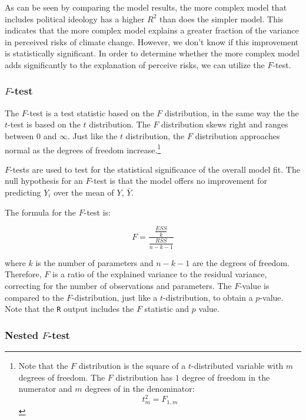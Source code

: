 \documentclass[11pt,openany]{book}\usepackage[]{graphicx}\usepackage[]{color}
\begin{document}
As can be seen by comparing the model results, the more complex model that includes political ideology has a higher $R^2$ than does the simpler model. This indicates that the more complex model explains a greater fraction of the variance in perceived risks of climate change. However, we don't know if this improvement is statistically significant. In order to determine whether the more complex model adds significantly to the explanation of perceive risks, we can utilize the $F$-test.  

\subsubsection{$F$-test}

The $F$-test is a test statistic based on the $F$ distribution, in the same way the the $t$-test is based on the $t$ distribution. The $F$ distribution skews right and ranges between $0$ and $\infty$. Just like the $t$ distribution, the $F$ distribution approaches normal as the degrees of freedom increase.\footnote{Note that the $F$ distribution is the square of a $t$-distributed variable with $m$ degrees of freedom. The $F$ distribution has $1$ degree of freedom in the numerator and $m$ degrees of in the denominator: 
\begin{equation*}
  t^2_m = F_{1,m} 
\end{equation*}}

$F$-tests are used to test for the statistical significance of the overall model fit. The null hypothesis for an $F$-test is that the model offers no improvement for predicting $Y_i$ over the mean of $Y$,
$\bar{Y}$. 

The formula for the $F$-test is: 

\begin{equation}
  F = \frac{\frac{ESS}{k}}{\frac{RSS}{n-k-1}}
\end{equation}

\noindent where $k$ is the number of parameters and $n-k-1$ are the degrees of freedom. Therefore, $F$ is a ratio of the explained variance to the residual variance, correcting for the number of observations and parameters. The $F$-value is compared to the $F$-distribution, just like a $t$-distribution, to obtain a $p$-value. Note that the \texttt{R} output includes the $F$ statistic and $p$ value. 

\subsubsection{Nested $F$-test}
\end{document}
